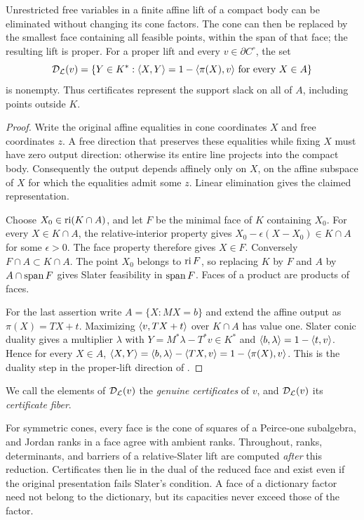 \begin{lemma}\label{lem:reduction}
Unrestricted free variables in a finite affine lift of a compact body can
be eliminated without changing its cone factors. The cone can then be
replaced by the smallest face containing all feasible points, within the
span of that face; the resulting lift is proper. For a proper lift and
every $v\in\partial C^\circ$, the set
\begin{equation}\label{eq:certificate-fiber}
 \mathcal D_{\mathcal L}(v)=\{Y\in K^*: \langle X,Y\rangle=1-\langle \pi(X),v\rangle
                    \text{ for every }X\in A\}
\end{equation}
is nonempty. Thus certificates represent the support slack on all of
$A$, including points outside $K$.
\end{lemma}
\begin{proof}
Write the original affine equalities in cone coordinates $X$ and free
coordinates $z$. A free direction that preserves these equalities while
fixing $X$ must have zero output direction: otherwise its entire line
projects into the compact body. Consequently the output depends affinely
only on $X$, on the affine subspace of $X$ for which the equalities admit
some $z$. Linear elimination gives the claimed representation.

Choose $X_0\in\operatorname{ri}(K\cap A)$, and let $F$ be the minimal face of $K$
containing $X_0$. For every $X\in K\cap A$, the relative-interior property
gives $X_0-\epsilon(X-X_0)\in K\cap A$ for some $\epsilon>0$.
The face property therefore gives $X\in F$. Conversely $F\cap A\subset
K\cap A$. The point $X_0$ belongs to $\operatorname{ri} F$, so replacing $K$ by $F$
and $A$ by $A\cap\operatorname{span} F$ gives Slater feasibility in $\operatorname{span} F$.
Faces of a product are products of faces.

For the last assertion write $A=\{X:MX=b\}$ and extend the affine output
as $\pi(X)=TX+t$. Maximizing $\langle v,TX+t\rangle$ over $K\cap A$ has value one.
Slater conic duality gives a multiplier $\lambda$ with
$Y=M^*\lambda-T^*v\in K^*$ and
$\langle b,\lambda\rangle=1-\langle t,v\rangle$. Hence for every $X\in A$,
$\langle X,Y\rangle=\langle b,\lambda\rangle-\langle TX,v\rangle=1-\langle \pi(X),v\rangle$.
This is the duality step in the proper-lift direction of
\cite[Theorem~2.4]{GPT2013}.
\end{proof}

We call the elements of $\mathcal D_{\mathcal L}(v)$ the \emph{genuine certificates}
of $v$, and $\mathcal D_{\mathcal L}(v)$ its \emph{certificate fiber}.

For symmetric cones, every face is the cone of squares of a Peirce-one
subalgebra, and Jordan ranks in a face agree with ambient ranks.
Throughout, ranks, determinants, and barriers of a relative-Slater lift
are computed \emph{after} this reduction. Certificates then lie in the dual
of the reduced face and exist even if the original presentation fails
Slater's condition. A face of a dictionary factor need not belong
to the dictionary, but its capacities never exceed those of the factor.

